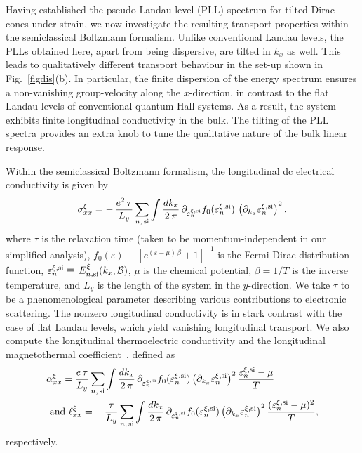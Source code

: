 \documentclass[aps,prb, onecolumn, nofootinbib, citeautoscript,10pt]{revtex4-2}
\def \nn{\nonumber \\}
\begin{document}
Having established the pseudo-Landau level (PLL) spectrum for tilted Dirac cones under strain, we now investigate the resulting transport properties within the semiclassical Boltzmann formalism. Unlike conventional Landau levels, the PLLs obtained here, apart from being dispersive, are tilted in $k_x$ as well. This leads to qualitatively different transport behaviour in the set-up shown in Fig.~\ref{figdis}(b). In particular, the finite dispersion of the energy spectrum ensures a non-vanishing group-velocity along the $x$-direction, in contrast to the flat Landau levels of conventional quantum-Hall systems. As a result, the system exhibits finite longitudinal conductivity in the bulk. The tilting of the PLL spectra provides an extra knob to tune the qualitative nature of the bulk linear response.


Within the semiclassical Boltzmann formalism, the longitudinal dc electrical conductivity is given by~\cite{arovas, ips-kush-review}
\begin{align}
\sigma^\xi_{xx} =  - \, \frac{e^2\,\tau} {L_y} \sum_{n, \, \text{si}} \int \frac{d k_x} {2 \,\pi}\,
\partial_{\varepsilon^{\xi, {\rm si }}_n} f_0 (\varepsilon^{\xi, {\rm si }}_n)
\, \left (\partial_{k_x }\varepsilon^{\xi, {\rm si }}_n \right)^2 ,
\end{align}
where $\tau$ is the relaxation time (taken to be momentum-independent in our simplified analysis), $ f_0  (\varepsilon) \equiv  \left[ e^{(\varepsilon - \mu)\,\beta} + 1\right ]^{-1} $ is the Fermi-Dirac distribution function, $ \varepsilon^{\xi, {\rm si }}_n \equiv \, 
 E^{\xi}_{n, \rm{si}} (k_x, \mathcal B)$, $\mu$ is the chemical potential, $\beta = 1/T $ is the inverse temperature, and $L_y$ is the length of the system in the $y$-direction. We take $\tau$ to be a phenomenological parameter describing various contributions to electronic scattering. The nonzero longitudinal conductivity is in stark contrast with the case of flat Landau levels, which yield vanishing longitudinal transport. 
We also compute the longitudinal thermoelectric conductivity and the longitudinal magnetothermal coefficient~\cite{arovas, ips-kush-review}, defined as
\begin{align}
& \alpha^\xi_{xx}  =  \frac{e\,\tau} {L_y} \sum_{n,\,\text{si}} \int \frac{d k_x} {2 \,\pi}\,
\partial_{\varepsilon^{\xi, {\rm si }}_n}  f_0 (\varepsilon^{\xi, {\rm si }}_n)\left (\partial_{k_x }\varepsilon^{\xi, {\rm si }}_n \right)^2  \frac{\varepsilon^{\xi, {\rm si }}_n - \mu}{T}
\nn & \text{ and } 
\ell^\xi_{xx} =  -\,\frac{\tau} {L_y} \sum_{n,\,\text{si}} \int \frac{d k_x} {2 \,\pi}\,
\partial_{\varepsilon^{\xi, {\rm si }}_n}  f_0 (\varepsilon^{\xi, {\rm si }}_n)\left (\partial_{k_x }\varepsilon^{\xi, {\rm si }}_n \right)^2  
\frac{ (\varepsilon^{\xi, {\rm si }}_n - \mu)^2}{T} ,
\label{eqalphaell}
\end{align}
respectively.
\end{document}
